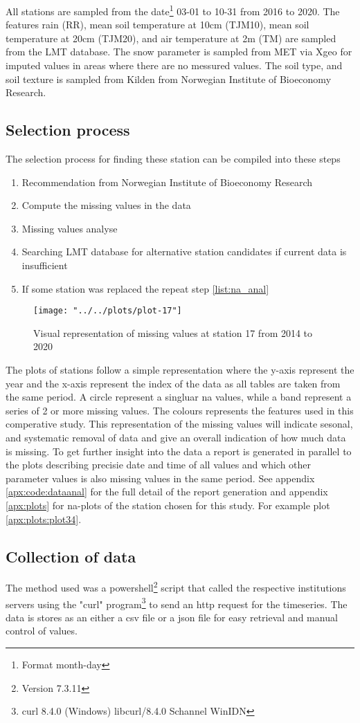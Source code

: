 All stations are sampled from the date\footnote{Format month-day} 03-01 to 10-31 from 2016 to 2020. The features rain (RR), mean soil temperature at 10cm (TJM10), mean soil temperature at 20cm (TJM20), and air temperature at 2m (TM) are sampled from the LMT database. The snow parameter is sampled from MET via Xgeo for imputed values in areas where there are no messured values. The soil type, and soil texture is sampled from Kilden from Norwegian Institute of Bioeconomy Research.

\subsection{Selection process}
The selection process for finding these station can be compiled into these steps

\begin{enumerate}
	\item Recommendation from Norwegian Institute of Bioeconomy Research
	\item \label{list:na_anal}Compute the missing values in the data
	\item Missing values analyse 
	\item Searching LMT database for alternative station candidates if current data is insufficient
	\item If some station was replaced the repeat step \ref{list:na_anal}
\end{enumerate}

\begin{figure}
	\label{fig:plot-17}
	\texttt{[image: "../../plots/plot-17"]}
	\caption{Visual representation of missing values at station 17 from 2014 to 2020}
\end{figure}

The plots of stations follow a simple representation where the y-axis represent the year and the x-axis represent the index of the data as all tables are taken from the same period. A circle represent a singluar na values, while a band represent a series of 2 or more missing values. The colours represents the features used in this comperative study. This representation of the missing values will indicate sesonal, and systematic removal of data and give an overall indication of how much data is missing. To get further insight into the data a report is generated in parallel to the plots describing precisie date and time of all values and which other parameter values is also missing values in the same period. See appendix \ref{apx:code:dataanal} for the full detail of the report generation and appendix \ref{apx:plots} for na-plots of the station chosen for this study. For example plot \ref{apx:plots:plot34}.

\subsection{Collection of data}

The method used was a powershell\footnote{Version 7.3.11} script that called the respective institutions servers using the "curl" program\footnote{curl 8.4.0 (Windows) libcurl/8.4.0 Schannel WinIDN} to send an http request for the timeseries. The data is stores as an either a csv file or a json file for easy retrieval and manual control of values. 